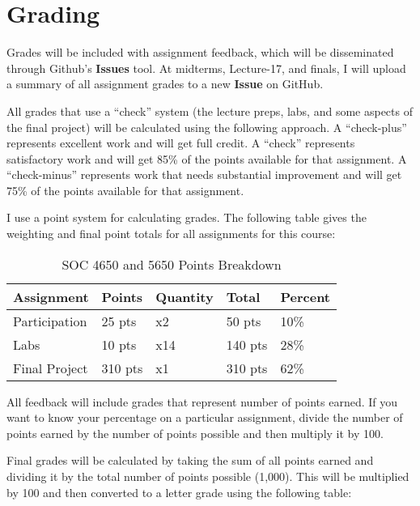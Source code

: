 \documentclass[
]{book}
\begin{document}
\hypertarget{grading}{%
\section{Grading}\label{grading}}

Grades will be included with assignment feedback, which will be disseminated through Github's \textbf{Issues} tool. At midterms, Lecture-17, and finals, I will upload a summary of all assignment grades to a new \textbf{Issue} on GitHub.

All grades that use a ``check'' system (the lecture preps, labs, and some aspects of the final project) will be calculated using the following approach. A ``check-plus'' represents excellent work and will get full credit. A ``check'' represents satisfactory work and will get 85\% of the points available for that assignment. A ``check-minus'' represents work that needs substantial improvement and will get 75\% of the points available for that assignment.

I use a point system for calculating grades. The following table gives the weighting and final point totals for all assignments for this course:

\begin{table}

\caption{\label{tab:unnamed-chunk-7}SOC 4650 and 5650 Points Breakdown}
\centering
\begin{tabular}[t]{lllll}
\toprule
Assignment & Points & Quantity & Total & Percent\\
\midrule
Participation & 25 pts & x2 & 50 pts & 10\%\\
Labs & 10 pts & x14 & 140 pts & 28\%\\
Final Project & 310 pts & x1 & 310 pts & 62\%\\
\bottomrule
\end{tabular}
\end{table}

All feedback will include grades that represent number of points earned. If you want to know your percentage on a particular assignment, divide the number of points earned by the number of points possible and then multiply it by 100.

Final grades will be calculated by taking the sum of all points earned and dividing it by the total number of points possible (1,000). This will be multiplied by 100 and then converted to a letter grade using the
following table:
\end{document}
